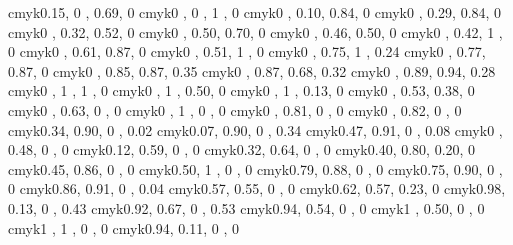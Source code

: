 \definecolor{greenyellow}   {cmyk}{0.15, 0   , 0.69, 0   }
\definecolor{yellow}        {cmyk}{0   , 0   , 1   , 0   }
\definecolor{goldenrod}     {cmyk}{0   , 0.10, 0.84, 0   }
\definecolor{dandelion}     {cmyk}{0   , 0.29, 0.84, 0   }
\definecolor{apricot}       {cmyk}{0   , 0.32, 0.52, 0   }
\definecolor{peach}         {cmyk}{0   , 0.50, 0.70, 0   }
\definecolor{melon}         {cmyk}{0   , 0.46, 0.50, 0   }
\definecolor{yelloworange}  {cmyk}{0   , 0.42, 1   , 0   }
\definecolor{orange}        {cmyk}{0   , 0.61, 0.87, 0   }
\definecolor{burntorange}   {cmyk}{0   , 0.51, 1   , 0   }
\definecolor{bittersweet}   {cmyk}{0   , 0.75, 1   , 0.24}
\definecolor{redorange}     {cmyk}{0   , 0.77, 0.87, 0   }
\definecolor{mahogany}      {cmyk}{0   , 0.85, 0.87, 0.35}
\definecolor{maroon}        {cmyk}{0   , 0.87, 0.68, 0.32}
\definecolor{brickred}      {cmyk}{0   , 0.89, 0.94, 0.28}
\definecolor{red}           {cmyk}{0   , 1   , 1   , 0   }
\definecolor{orangered}     {cmyk}{0   , 1   , 0.50, 0   }
\definecolor{rubinered}     {cmyk}{0   , 1   , 0.13, 0   }
\definecolor{salmon}        {cmyk}{0   , 0.53, 0.38, 0   }
\definecolor{carnationpink} {cmyk}{0   , 0.63, 0   , 0   }
\definecolor{magenta}       {cmyk}{0   , 1   , 0   , 0   }
\definecolor{violetred}     {cmyk}{0   , 0.81, 0   , 0   }
\definecolor{rhodamine}     {cmyk}{0   , 0.82, 0   , 0   }
\definecolor{mulberry}      {cmyk}{0.34, 0.90, 0   , 0.02}
\definecolor{redviolet}     {cmyk}{0.07, 0.90, 0   , 0.34}
\definecolor{fuchsia}       {cmyk}{0.47, 0.91, 0   , 0.08}
\definecolor{lavender}      {cmyk}{0   , 0.48, 0   , 0   }
\definecolor{thistle}       {cmyk}{0.12, 0.59, 0   , 0   }
\definecolor{orchid}        {cmyk}{0.32, 0.64, 0   , 0   }
\definecolor{darkorchid}    {cmyk}{0.40, 0.80, 0.20, 0   }
\definecolor{purple}        {cmyk}{0.45, 0.86, 0   , 0   }
\definecolor{plum}          {cmyk}{0.50, 1   , 0   , 0   }
\definecolor{violet}        {cmyk}{0.79, 0.88, 0   , 0   }
\definecolor{royalpurple}   {cmyk}{0.75, 0.90, 0   , 0   }
\definecolor{blueviolet}    {cmyk}{0.86, 0.91, 0   , 0.04}
\definecolor{periwinkle}    {cmyk}{0.57, 0.55, 0   , 0   }
\definecolor{cadetblue}     {cmyk}{0.62, 0.57, 0.23, 0   }
\definecolor{midnightblue}  {cmyk}{0.98, 0.13, 0   , 0.43}
\definecolor{darkblue}      {cmyk}{0.92, 0.67, 0   , 0.53}
\definecolor{navyblue}      {cmyk}{0.94, 0.54, 0   , 0   }
\definecolor{royalblue}     {cmyk}{1   , 0.50, 0   , 0   }
\definecolor{blue}          {cmyk}{1   , 1   , 0   , 0   }
\definecolor{cerulean}      {cmyk}{0.94, 0.11, 0   , 0   }
